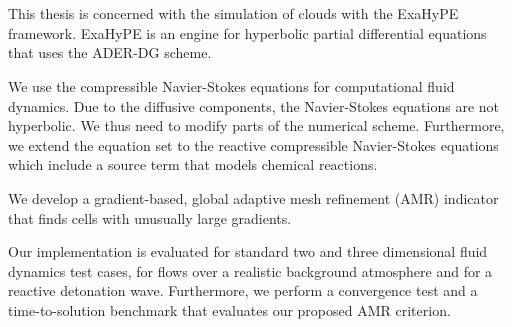 \chapter{\abstractname}
This thesis is concerned with the simulation of clouds with the ExaHyPE framework.
ExaHyPE is an engine for hyperbolic partial differential equations that uses the ADER-DG scheme.

We use the compressible Navier-Stokes equations for computational fluid dynamics.
Due to the diffusive components, the Navier-Stokes equations are not hyperbolic.
We thus need to modify parts of the numerical scheme.
Furthermore, we extend the equation set to the reactive compressible Navier-Stokes equations which include a source term that models chemical reactions.

We develop a gradient-based, global adaptive mesh refinement (AMR) indicator that finds cells with unusually large gradients.

Our implementation is evaluated for standard two and three dimensional fluid dynamics test cases, for flows over a realistic background atmosphere and for a reactive detonation wave.
Furthermore, we perform a convergence test and a time-to-solution benchmark that evaluates our proposed AMR criterion.

